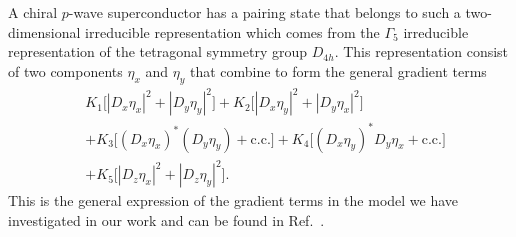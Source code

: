 A chiral $p$-wave superconductor has a pairing state that
belongs to such a two-dimensional irreducible representation which comes from the $\Gamma_5$ irreducible representation of the
tetragonal symmetry group $D_{4h}$. This representation consist of two components $\eta_x$ and $\eta_y$ that combine
to form the general gradient terms
\begin{equation}
    \label{eq:statMech:gradTerms:chiralPWave}
    \begin{split}
        &K_1\big[|D_x\eta_x|^2 + |D_y\eta_y|^2\big] + K_2\big[|D_x\eta_y|^2 + |D_y\eta_x|^2\big]\\
        & + K_3\big[(D_x\eta_x)^\ast(D_y\eta_y) + \text{c.c.}\big] + K_4\big[(D_x\eta_y)^\ast D_y\eta_x + \text{c.c.}\big]\\
        & + K_5\big[|D_z\eta_x|^2 + |D_z\eta_y|^2\big].
    \end{split}
\end{equation}
This is the general expression of the gradient terms in the model we have investigated in our work and can be found in Ref.~\cite{SigristUeda91}.
